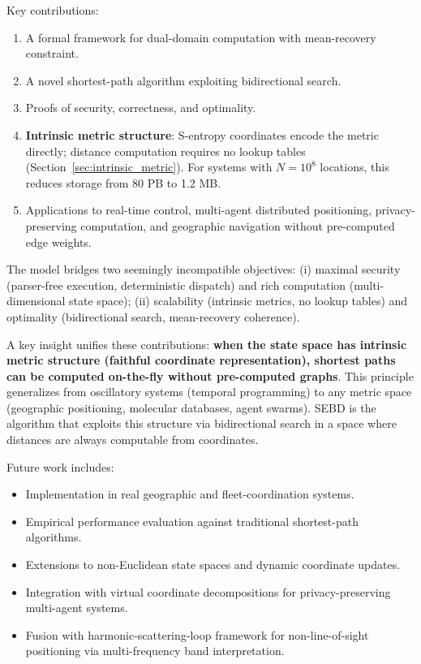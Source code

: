\documentclass[twocolumn,11pt,a4paper]{article}
\begin{document}
Key contributions:
\begin{enumerate}[nosep]
  \item A formal framework for dual-domain computation with mean-recovery constraint.
  \item A novel shortest-path algorithm exploiting bidirectional search.
  \item Proofs of security, correctness, and optimality.
  \item \textbf{Intrinsic metric structure}: S-entropy coordinates encode the metric directly; distance computation requires no lookup tables (Section~\ref{sec:intrinsic_metric}). For systems with $N=10^8$ locations, this reduces storage from 80 PB to 1.2 MB.
  \item Applications to real-time control, multi-agent distributed positioning, privacy-preserving computation, and geographic navigation without pre-computed edge weights.
\end{enumerate}

The model bridges two seemingly incompatible objectives: (i) maximal security (parser-free execution, deterministic dispatch) and rich computation (multi-dimensional state space); (ii) scalability (intrinsic metrics, no lookup tables) and optimality (bidirectional search, mean-recovery coherence).

A key insight unifies these contributions: \textbf{when the state space has intrinsic metric structure (faithful coordinate representation), shortest paths can be computed on-the-fly without pre-computed graphs}. This principle generalizes from oscillatory systems (temporal programming) to any metric space (geographic positioning, molecular databases, agent swarms). SEBD is the algorithm that exploits this structure via bidirectional search in a space where distances are always computable from coordinates.

Future work includes:
\begin{itemize}[nosep]
  \item Implementation in real geographic and fleet-coordination systems.
  \item Empirical performance evaluation against traditional shortest-path algorithms.
  \item Extensions to non-Euclidean state spaces and dynamic coordinate updates.
  \item Integration with virtual coordinate decompositions for privacy-preserving multi-agent systems.
  \item Fusion with harmonic-scattering-loop framework for non-line-of-sight positioning via multi-frequency band interpretation.
\end{itemize}
\end{document}

